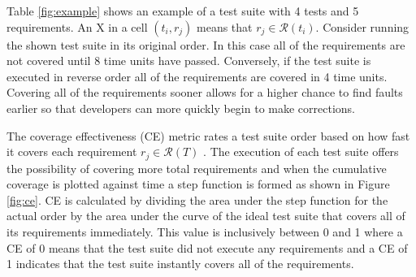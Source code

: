 \documentclass{vgtc}                          %
\begin{document}
Table \ref{fig:example} shows an example of a test suite with 4 tests and 5 requirements.  An X in a cell $(t_i, r_j)$ means that $r_j \in \mathcal{R}(t_i)$.  Consider running the shown test suite in its original order.  In this case all of the requirements are not covered until 8 time units have passed.  Conversely, if the test suite is executed in reverse order all of the requirements are covered in 4 time units.  Covering all of the requirements sooner allows for a higher chance to find faults earlier so that developers can more quickly begin to make corrections.

The coverage effectiveness (CE) metric rates a test suite order based on how fast it covers each requirement $r_j \in \mathcal{R}(T)$ \cite{ce}.  The execution of each test suite offers the possibility of covering more total requirements and when the cumulative coverage is plotted against time a step function is formed as shown in Figure \ref{fig:ce}.  CE is calculated by dividing the area under the step function for the actual order by the area under the curve of the ideal test suite that covers all of its requirements immediately.  This value is inclusively between 0 and 1 where a CE of 0 means that the test suite did not execute any requirements and a CE of 1 indicates that the test suite instantly covers all of the requirements.


\begin{table}[t]
\centering
{}
\vspace{-.1in}
\caption{Example Test Suite}

\vspace{-.15in}

\end{table}
\label{fig:example}
\end{document}
